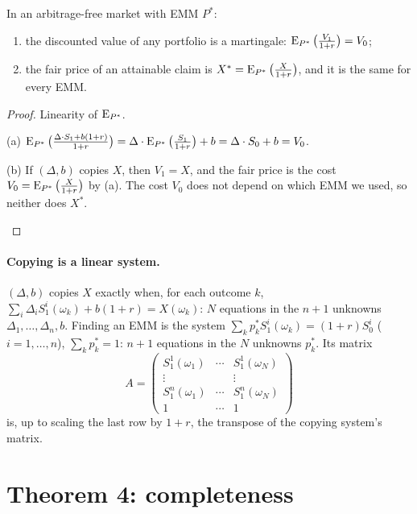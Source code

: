 \begin{theorem}
\label{thm:pricing}
In an arbitrage-free market with EMM $P^*$:
\begin{enumerate}[label=(\alph*)]
  \item the discounted value of any portfolio is a martingale: $\operatorname{E}_{P^*}\big(\frac{V_1}{1+r}\big)=V_0$;
  \item the fair price of an attainable claim is $X^*=\operatorname{E}_{P^*}\big(\frac{X}{1+r}\big)$, and it is the same for every EMM.
\end{enumerate}
\end{theorem}
\begin{proof}
Linearity of $\operatorname{E}_{P^*}$.
\begin{steps}
  \item (a) $\operatorname{E}_{P^*}\big(\frac{\Delta\cdot S_1+b(1+r)}{1+r}\big)=\Delta\cdot\operatorname{E}_{P^*}\big(\frac{S_1}{1+r}\big)+b=\Delta\cdot S_0+b=V_0$.
  \item (b) If $(\Delta,b)$ copies $X$, then $V_1=X$, and the fair price is the cost $V_0=\operatorname{E}_{P^*}\big(\frac{X}{1+r}\big)$ by (a). The cost $V_0$ does not depend on which EMM we used, so neither does $X^*$. \qedhere
\end{steps}
\end{proof}

\paragraph{Copying is a linear system.} $(\Delta,b)$ copies $X$ exactly when, for each outcome $k$, $\sum_i\Delta_iS_1^i(\omega_k)+b(1+r)=X(\omega_k)$: $N$ equations in the $n+1$ unknowns $\Delta_1,\dots,\Delta_n,b$. Finding an EMM is the system $\sum_kp^*_kS_1^i(\omega_k)=(1+r)S_0^i$ ($i=1,\dots,n$), $\sum_kp^*_k=1$: $n+1$ equations in the $N$ unknowns $p^*_k$. Its matrix
\[
  A=\begin{pmatrix}S_1^1(\omega_1)&\cdots&S_1^1(\omega_N)\\ \vdots&&\vdots\\ S_1^n(\omega_1)&\cdots&S_1^n(\omega_N)\\ 1&\cdots&1\end{pmatrix}
\]
is, up to scaling the last row by $1+r$, the transpose of the copying system's matrix.

\section{Theorem 4: completeness}

